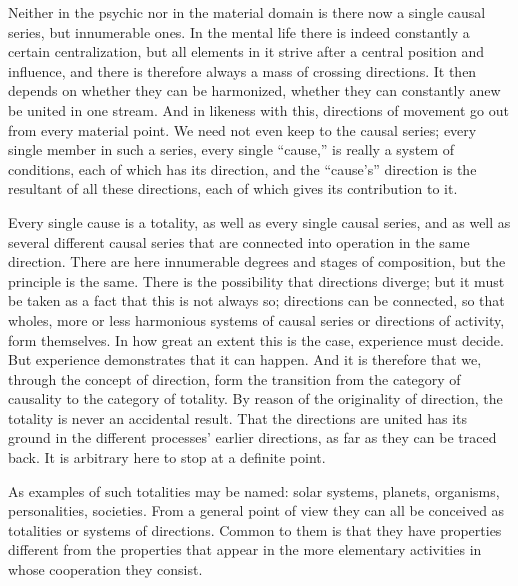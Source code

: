 \documentclass[12pt,a4paper]{book}
\newcommand{\opage}[1]{\marginnote{\footnotesize\textit{[#1]}}}
\begin{document}
Neither in the psychic nor in the material domain is there now a single
causal series, but innumerable ones. In the mental life there is indeed
constantly a certain centralization, but all elements in it strive after a
central position and influence, and there is therefore always a mass of
crossing directions. It then depends on whether they can be harmonized,
whether they can constantly anew be united in one stream. And in likeness
with this, directions of movement go out from every material point. We need
not even keep to the causal series; every single member in such a series,
every single ``cause,'' is really a system of conditions, each of which has
its direction, and the ``cause's'' direction is the resultant of all these
directions, each of which gives its contribution to it.

Every single cause is a totality, as well as every single causal series, and
as well as several different causal series that are connected into operation
in the same direction. There are here innumerable degrees and stages of
composition, but the principle is the same. There is the possibility that
directions diverge; but it must be taken as a fact that this is not always so;
directions can be connected, so that wholes, more or less harmonious systems
of causal series or directions of activity, form themselves. In how great an
extent this is \opage{220}the case, experience must decide. But experience demonstrates
that it can happen. And it is therefore that we, through the concept of
direction, form the transition from the category of causality to the category
of totality. By reason of the originality of direction, the totality is never
an accidental result. That the directions are united has its ground in the
different processes' earlier directions, as far as they can be traced back. It
is arbitrary here to stop at a definite point.

As examples of such totalities may be named: solar systems, planets,
organisms, personalities, societies. From a general point of view they can all
be conceived as totalities or systems of directions. Common to them is that
they have properties different from the properties that appear in the more
elementary activities in whose cooperation they consist.
\end{document}

